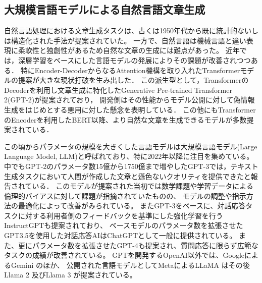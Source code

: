 \subsection{大規模言語モデルによる自然言語文章生成}
自然言語処理における文章生成タスクは、古くは1950年代から既に統計的ないしは構造化された手法\cite{Fine1998,10.1162/089120102762671972}が提案されていた。
一方で、自然言語は機械言語と違い表現に柔軟性と独創性があるため自然な文章の生成には難点があった。
近年では，深層学習をベースにした言語モデルの発展によりその課題が改善されつつある．
特にEncoder-DecoderからなるAttention機構を取り入れたTransformerモデルの提案\cite{NIPS2017_3f5ee243}が大きな現状打破を生み出した．
この派生型として，TransformerのDecoderを利用し文章生成に特化したGenerative Pre-trained Transformer 2(GPT-2)が提案\cite{Radford_GPT2}されており，
開発側はその性能からモデル公開に対して偽情報生成をはじめとする悪用に対した懸念を表明している\cite{solaiman_clark_brundage_2020}．
この他にもTransformerのEncoderを利用したBERT\cite{devlin2019bert}以降、より自然な文章を生成できるモデルが多数提案されている．

この頃からパラメータの規模を大きくした言語モデルは大規模言語モデル(Large Language Model, LLM)と呼ばれており、特に2022年以降に注目を集めている。 %
中でもGPT-2のパラメータ数15億から1750億まで増やしたGPT-3では，テキスト生成タスクにおいて人間が作成した文章と遜色ないクオリティを提供できたと報告されている\cite{brown2020language}．
このモデルが提案された当初では数学課題や学習データによる倫理的バイアスに対して課題が指摘されていた\cite{Floridi2020,Chan2023}ものの、
モデルの調整\cite{borchers-etal-2022-looking}や指示方法の最適化\cite{NEURIPS2022_8bb0d291,NEURIPS2022_9d560961}によって改善がみられている\cite{DBLP:conf/aied/AnLG23}。
またGPT-3をベースに、対話応答タスクに対する利用者側のフィードバックを基準にした強化学習を行うInstructGPTも提案されており\cite{NEURIPS2022_b1efde53}、
ベースモデルのパラメータ数を拡張させたGPT3.5を使用した対話応答AIはChatGPTとして一般に提供されている\cite{RAY2023121}。
また、更にパラメータ数を拡張させたGPT-4も提案され、質問応答に限らず広範なタスクの成績が改善されている\cite{openai2023gpt4}。
GPTを開発するOpenAI以外では、GoogleによるGemini \cite{geminiteam2024geminifamilyhighlycapable, geminiteam2024gemini15unlockingmultimodal}のほか、
公開された言語モデルとしてMetaによるLLaMA \cite{touvron2023llamaopenefficientfoundation}はその後 Llama 2 \cite{touvron2023llama2openfoundation} 及びLlama 3 \cite{dubey2024llama3herdmodels} が提案されている。


